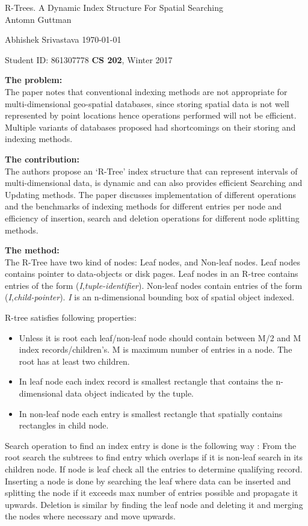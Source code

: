 \documentclass[a4paper,12pt, twoside]{article}
\renewcommand{\maketitle}{%
 	\Large
 	\begin{center}
 	R-Trees. A Dynamic Index Structure For Spatial Searching \\	
 	\normalsize Antomn Guttman
 	\end{center}
 
 	\Large
	Abhishek Srivastava
	\hfill
	\normalsize
	\today
 	\par
 	Student ID: 861307778
 	\hfill
 	\textbf{CS 202}, Winter 2017
 	\par 	
 	\hrulefill
 	\par
 	}
\begin{document}
\thispagestyle{empty}
	
\maketitle

\textbf{The problem:}\\
The paper notes that conventional indexing methods are not appropriate for multi-dimensional geo-spatial databases, since storing spatial data is not well represented by point locations hence operations performed will not be efficient. Multiple variants of databases proposed had shortcomings on their storing and indexing methods.

\textbf{The contribution:}\\
The authors propose an `R-Tree' index structure that can represent intervals of multi-dimensional data, is dynamic and can also provides efficient Searching and Updating methods. The paper discusses implementation of different operations and the benchmarks of indexing methods for different entries per node and efficiency of insertion, search and deletion operations for different node splitting methods.

\textbf{The method:}\\
The R-Tree have two kind of nodes: Leaf nodes, and Non-leaf nodes. Leaf nodes contains pointer to data-objects or disk pages. Leaf nodes in an R-tree contains entries of the form (\emph{I},\emph{tuple-identifier}). Non-leaf nodes contain entries of the form (\emph{I},\emph{child-pointer}). \emph{I} is an n-dimensional bounding box of spatial object indexed.

R-tree satisfies following properties:
\begin{itemize}
	\item Unless it is root each leaf/non-leaf node should contain between M/2 and M index records/children's. M is maximum number of entries in a node. The root has at least two children.
	\item In leaf node each index record is smallest rectangle that contains the n-dimensional data object indicated by the tuple.
	\item In non-leaf node each entry is smallest rectangle that spatially contains rectangles in child node. 
\end{itemize}

Search operation to find an index entry is done is the following way : From the root search the subtrees to find entry which overlaps if it is non-leaf search in its children node. If node is leaf check all the entries to determine qualifying record. Inserting a node is done by searching the leaf where data can be inserted and splitting the node if it exceeds max number of entries possible and propagate it upwards. Deletion is similar by finding the leaf node and deleting it and merging the nodes where necessary and move upwards.  
\end{document}
